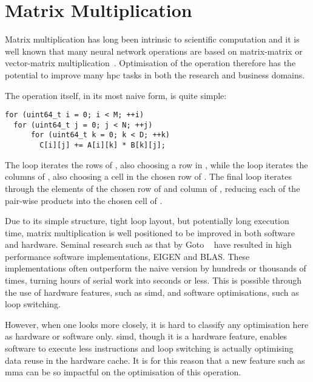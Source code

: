 \documentclass[\main/thesis.tex]{subfiles}
\begin{document}
\section{Matrix Multiplication}
Matrix multiplication has long been intrinsic to scientific computation and it is well known that many neural network operations are based on matrix-matrix or vector-matrix multiplication~\autocite{rojas1996neural,blue1992training}.
Optimisation of the operation therefore has the potential to improve many \gls{hpc} tasks in both the research and business domains.

The operation itself, in its most naive form, is quite simple:
\begin{lstlisting}[caption={[Basic Matrix Multiplication]A basic matrix multiplication.},label=lst:basicmatmul]
for (uint64_t i = 0; i < M; ++i)
  for (uint64_t j = 0; j < N; ++j)
      for (uint64_t k = 0; k < D; ++k)
        C[i][j] += A[i][k] * B[k][j];
\end{lstlisting}
The  loop iterates the rows of , also choosing a row in , while the  loop iterates the columns of , also choosing a cell in the chosen row of .
The final  loop iterates through the elements of the chosen row of  and column of , reducing each of the pair-wise products into the chosen cell of .

Due to its simple structure, tight loop layout, but potentially long execution time, matrix multiplication is well positioned to be improved in both software and hardware.
Seminal research such as that by Goto \etal~\autocite{goto2008anatomy} have resulted in high performance software implementations, \eg EIGEN and BLAS.
These implementations often outperform the naive version by hundreds or thousands of times, turning hours of serial work into seconds or less.
This is possible through the use of hardware features, such as \gls{simd}, and software optimisations, such as loop switching.

However, when one looks more closely, it is hard to classify any optimisation here as hardware or software only.
\Gls{simd}, though it is a hardware feature, enables software to execute less instructions and loop switching is actually optimising data reuse in the hardware cache.
It is for this reason that a new feature such as \gls{mma} can be so impactful on the optimisation of this operation.
\end{document}
